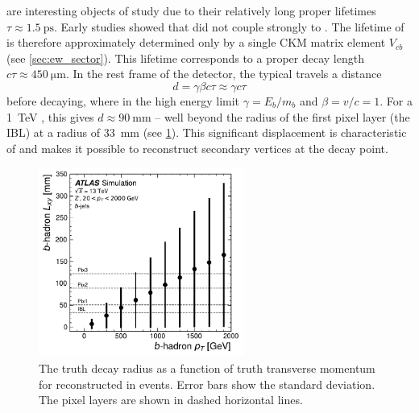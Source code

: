 \bhadrons are interesting objects of study due to their relatively long proper lifetimes $\tau \approx \SI{1.5}{\pico\second}$.
Early studies showed that \bhadrons did not couple strongly to \lquarks \cite{PhysRevLett.52.1084}.
The lifetime of \bhadrons is therefore approximately determined only by a single CKM matrix element $V_{cb}$ (see \cref{sec:ew_sector}).
This lifetime corresponds to a proper decay length $c \tau \approx \SI{450}{\micro\meter}$.
In the rest frame of the detector, the typical \bhadron travels a distance 
\begin{equation}
  d = \gamma \beta c \tau \approx \gamma c \tau
\end{equation}
before decaying, where in the high energy limit $\gamma = E_b/m_b$ and $\beta = v/c = 1$.
For a \SI{1}{\TeV} \bhadron, this gives $d \approx \SI{90}{\milli\meter}$ -- well beyond the radius of the first pixel layer (the IBL) at a radius of \SI{33}{\milli\meter} (see \cref{fig:b_lxy_vs_pt}).
This significant displacement is characteristic of \bjets and makes it possible to reconstruct secondary vertices at the \bhadron decay point.

\begin{figure}[!htbp]
  \centering
  \includegraphics[width=0.6\textwidth]{chapters/3.tracking/figs/b_pt_lxy.pdf}
  \caption{
    The truth \bhadron decay radius \Lxy as a function of truth transverse momentum \pt for reconstructed \bjets in \Zprime events.
    Error bars show the standard deviation.
    The pixel layers are shown in dashed horizontal lines.
  }
  \label{fig:b_lxy_vs_pt}
\end{figure}

